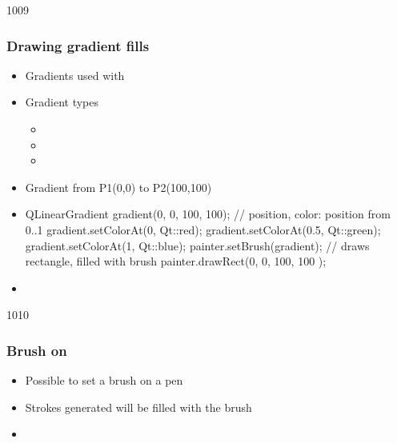 \begin{slide}[fragile]{1009}
\frametitle{Drawing gradient fills}
\begin{itemize}                    
  \item Gradients used with 
  \item Gradient types
  \begin{itemize}
  \item {}
  \item {}
  \item {}
  \end{itemize} 
  \item Gradient from P1(0,0) to P2(100,100)
  \item[] \begin{cpp}   
QLinearGradient gradient(0, 0, 100, 100);
// position, color: position from 0..1
gradient.setColorAt(0, Qt::red); 
gradient.setColorAt(0.5, Qt::green);
gradient.setColorAt(1, Qt::blue);
painter.setBrush(gradient);
// draws rectangle, filled with brush
painter.drawRect(0, 0, 100, 100 );
  \end{cpp}                  
  \item {}
\end{itemize}
\end{slide}

\begin{slide}[fragile]{1010}\frametitle{Brush on }
\begin{itemize}
\item Possible to set a brush on a pen
\item Strokes generated will be filled with the brush
\vfill
  \vfill
\item {}
\end{itemize}
\end{slide}


